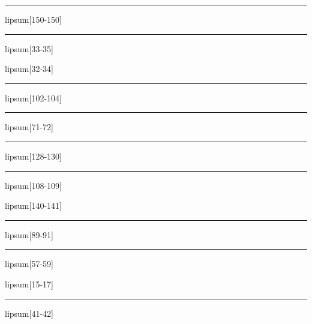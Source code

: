 \documentclass[11pt,a4paper]{article}
\begin{document}
\begin{simplewrap}
  \textcolor{yellow!35}{\rule{4.1cm}{7.0cm}}
\end{simplewrap}
lipsum[150-150]

\begin{simplewrap}
  \textcolor{green!11}{\rule{6.0cm}{3.6cm}}
\end{simplewrap}
lipsum[33-35]

lipsum[32-34]

\begin{simplewrap}
  \textcolor{blue!39}{\rule{3.2cm}{9.4cm}}
\end{simplewrap}
lipsum[102-104]

\begin{simplewrap}
  \textcolor{pink!53}{\rule{4.3cm}{4.8cm}}
\end{simplewrap}
lipsum[71-72]

\begin{simplewrap}
  \textcolor{purple!12}{\rule{4.8cm}{6.9cm}}
\end{simplewrap}
lipsum[128-130]

\begin{simplewrap}
  \textcolor{magenta!40}{\rule{3.2cm}{4.2cm}}
\end{simplewrap}
lipsum[108-109]

lipsum[140-141]

\begin{simplewrap}
  \textcolor{red!34}{\rule{5.3cm}{4.9cm}}
\end{simplewrap}
lipsum[89-91]

\begin{simplewrap}
  \textcolor{cyan!30}{\rule{4.2cm}{3.4cm}}
\end{simplewrap}
lipsum[57-59]

lipsum[15-17]

\begin{simplewrap}
  \textcolor{red!43}{\rule{4.1cm}{6.7cm}}
\end{simplewrap}
lipsum[41-42]
\end{document}
